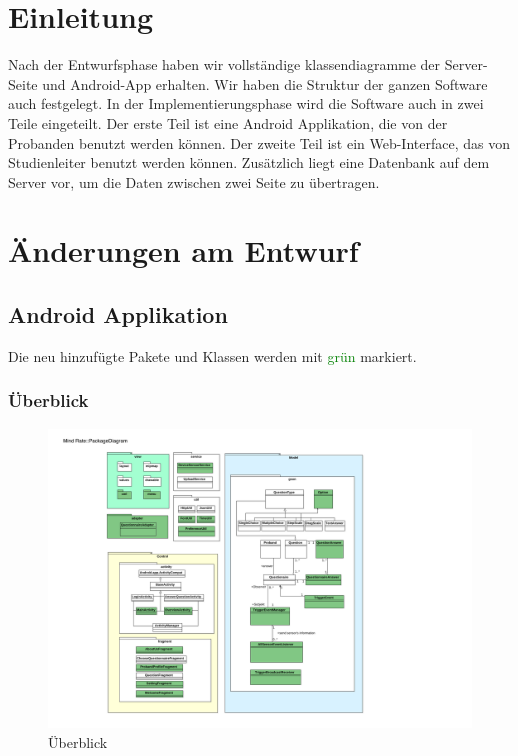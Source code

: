 \documentclass[a4paper]{scrreprt}
\begin{document}
    \tableofcontents

    \chapter{Einleitung}

        Nach der Entwurfsphase haben wir vollständige klassendiagramme der Server-Seite und Android-App erhalten. Wir haben die Struktur der ganzen Software auch festgelegt. In der Implementierungsphase wird die Software auch in zwei Teile eingeteilt. Der erste Teil ist eine Android Applikation, die von der Probanden benutzt werden können. Der zweite Teil ist ein Web-Interface, das von Studienleiter benutzt werden können. Zusätzlich liegt eine Datenbank auf dem Server vor, um die Daten zwischen zwei Seite zu übertragen.





    \newpage
    \chapter{Änderungen am Entwurf}


        \section{Android Applikation}

            Die neu hinzufügte Pakete und Klassen werden mit \textcolor{green}{grün} markiert.

            \subsection{Überblick}

                \begin{figure}[H]
                    \centering
                    \includegraphics[scale = 0.9]{Images/PackageDiagram.pdf}
                    \caption{Überblick}
                \end{figure}
\end{document}

